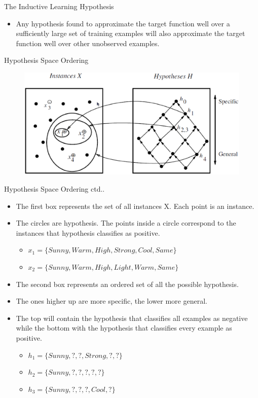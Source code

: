 \documentclass[%
pdf,
colorBG,
slideColor,
tcrico,
]{prosper}
\begin{document}



\begin{slide}{The Inductive Learning Hypothesis}
\begin{itemize}
\item Any hypothesis found to approximate
the target function well over a sufficiently large set of training examples
will also approximate the target function well over other unobserved examples.
\end{itemize}
\end{slide}

\begin{slide}{Hypothesis Space Ordering}
\begin{figure}
	\centering
	\includegraphics[scale=0.3]{hypoSpace.eps}
\end{figure}
\end{slide}

\begin{slide}{Hypothesis Space Ordering ctd..}
\tiny
\begin{itemize}
\item The first box represents the set of all instances X. Each point is an instance. 
\item The circles are hypothesis. The points inside a circle correspond to the instances that hypothesis classifies as positive.
	\begin{itemize}
	\item $x_1 =\{Sunny,Warm,High,Strong,Cool,Same\}$
	\item $x_2 = \{Sunny,Warm,High,Light,Warm,Same\}$
	\end{itemize}
\item The second box represents an ordered set of all the possible hypothesis. 
\item The ones higher up are more specific, the lower more general.
\item The top will contain the hypothesis that classifies all	examples as negative while the bottom with the hypothesis that classifies every example as positive.
	\begin{itemize}	
	\item $h_1 =\{Sunny,?,?,Strong,?,?\}$
	\item $h_2 =\{Sunny,?,?,?,?,?\}$
	\item $h_3 = \{Sunny,?,?,?,Cool,?\}$
	\end{itemize}
\end{itemize}
\end{slide}
\end{document}
